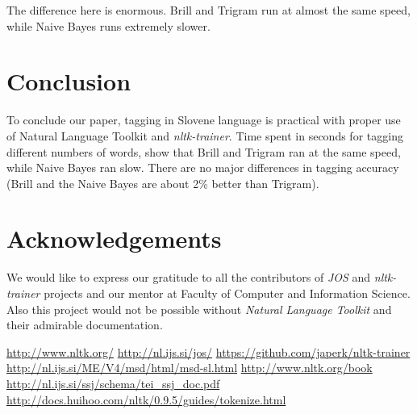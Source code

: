 \documentclass[10pt, conference, compsocconf]{IEEEtran}
\begin{document}
The difference here is enormous. Brill and Trigram run at almost the same speed, while Naive Bayes runs extremely slower.

\section{Conclusion} %

To conclude our paper, tagging in Slovene language is practical with proper use of Natural Language Toolkit and \textit{nltk-trainer}. Time spent in seconds for tagging different numbers of words, show that Brill and Trigram ran at the same speed, while Naive Bayes ran slow. There are no major differences in tagging accuracy (Brill and the Naive Bayes are about 2\% better than Trigram).

\section*{Acknowledgements}
We would like to express our gratitude to all the contributors of \textit{JOS} \cite{JOS} and  \textit{nltk-trainer} \cite{nltk-trainer} projects and our mentor at Faculty of Computer and Information Science. Also this project would not be possible without \textit{Natural Language Toolkit} \cite{nltk} and their admirable documentation.
\\
\begin{thebibliography}{99}
 \url{http://www.nltk.org/}
 \url{http://nl.ijs.si/jos/}
 \url{https://github.com/japerk/nltk-trainer}
 \url{http://nl.ijs.si/ME/V4/msd/html/msd-sl.html}
 \url{http://www.nltk.org/book}
 \url{http://nl.ijs.si/ssj/schema/tei_ssj_doc.pdf}
 \url{http://docs.huihoo.com/nltk/0.9.5/guides/tokenize.html}
\end{thebibliography}
\end{document}
